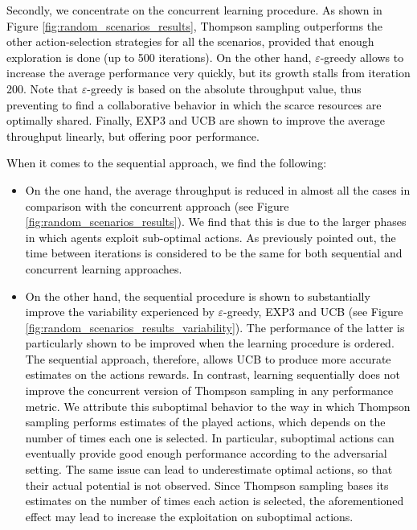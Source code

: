 \documentclass{article}
\begin{document}
	\textcolor{black}{Secondly, we concentrate on the concurrent learning procedure. As shown in Figure \ref{fig:random_scenarios_results}, Thompson sampling outperforms the other action-selection strategies for all the scenarios, provided that enough exploration is done (up to 500 iterations). On the other hand, $\varepsilon$-greedy allows to increase the average performance very quickly, but its growth stalls from iteration 200. Note that $\varepsilon$-greedy is based on the absolute throughput value, thus preventing to find a collaborative behavior in which the scarce resources are optimally shared. Finally, EXP3 and UCB are shown to improve the average throughput linearly, but offering poor performance.}
	
	\textcolor{black}{When it comes to the sequential approach, we find the following:}
	\begin{itemize}
		\item \textcolor{black}{On the one hand, the average throughput is reduced in almost all the cases in comparison with the concurrent approach (see Figure \ref{fig:random_scenarios_results}). We find that this is due to the larger phases in which agents exploit sub-optimal actions. As previously pointed out, the time between iterations is considered to be the same for both sequential and concurrent learning approaches.}
		\item \textcolor{black}{On the other hand, the sequential procedure is shown to substantially improve the variability experienced by $\varepsilon$-greedy, EXP3 and UCB (see Figure \ref{fig:random_scenarios_results_variability}). The performance of the latter is particularly shown to be improved when the learning procedure is ordered. The sequential approach, therefore, allows UCB to produce more accurate estimates on the actions rewards. In contrast, learning sequentially does not improve the concurrent version of Thompson sampling in any performance metric. We attribute this suboptimal behavior to the way in which Thompson sampling performs estimates of the played actions, which depends on the number of times each one is selected. In particular, suboptimal actions can eventually provide good enough performance according to the adversarial setting. The same issue can lead to underestimate optimal actions, so that their actual potential is not observed. Since Thompson sampling bases its estimates on the number of times each action is selected, the aforementioned effect may lead to increase the exploitation on suboptimal actions.}
	\end{itemize}
	
\end{document}
